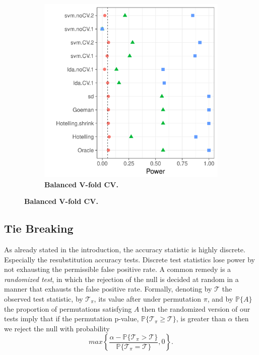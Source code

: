\documentclass[12pt,a4paper]{article}
\begin{document}
\begin{figure}[h]
\begin{subfigure}{.5\textwidth}
		\includegraphics[width=1\linewidth]{"art/file2"}
		\caption{\textbf{Balanced V-fold CV.}} 
		\label{fig:file2}
	\end{subfigure}
\end{figure}



\subsection{Tie Breaking}
\label{sec:ties}

As already stated in the introduction, the accuracy statistic is highly discrete. 
Especially the resubstitution accuracy tests. 
Discrete test statistics lose power by not exhausting the permissible false positive rate. 
A common remedy is a \emph{randomized test}, in which the rejection of the null is decided at random in a manner that exhausts the false positive rate. 
Formally, denoting by $\mathcal{T}$ the observed test statistic, by $\mathcal{T}_\pi$, its value after under permutation $\pi$, and by $\mathbb{P}\{A\}$ the proportion of permutations satisfying $A$ then the randomized version of our tests imply that if the permutation p-value, 
$\mathbb{P}\{\mathcal{T}_\pi \geq \mathcal{T}\}$, 
is greater than  $\alpha$ then we reject the null with probability 
$$ max\left\{\frac{\alpha - \mathbb{P}\{\mathcal{T}_\pi > \mathcal{T}\}}{\mathbb{P}\{\mathcal{T}_\pi = \mathcal{T}\}},0 \right\}.$$
\end{document}

